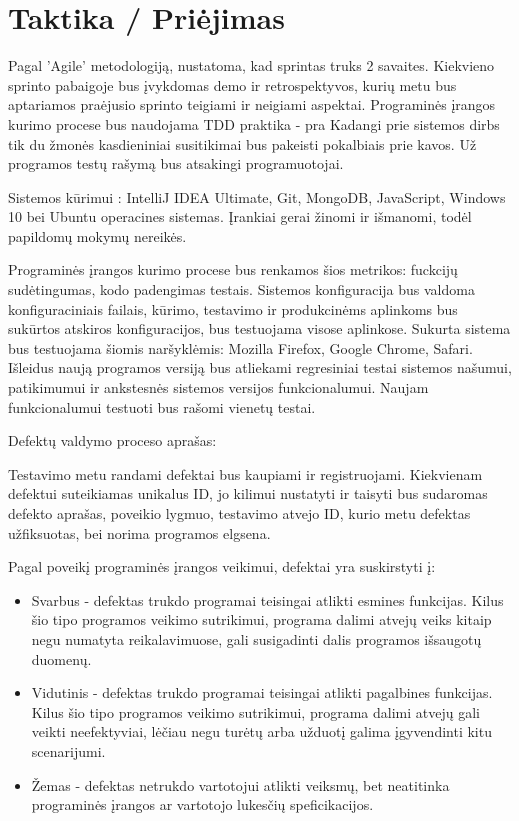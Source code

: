\section{Taktika / Priėjimas}

Pagal 'Agile' metodologiją, nustatoma, kad sprintas truks 2 savaites.
Kiekvieno sprinto pabaigoje bus įvykdomas demo ir retrospektyvos,
 kurių metu bus aptariamos praėjusio sprinto teigiami ir neigiami aspektai.
Programinės įrangos kurimo procese bus naudojama TDD praktika - pra
Kadangi prie sistemos dirbs tik du žmonės kasdieniniai susitikimai bus pakeisti pokalbiais prie kavos.
Už programos testų rašymą bus atsakingi programuotojai.


Sistemos kūrimui : IntelliJ IDEA Ultimate, Git, MongoDB, JavaScript, Windows 10 bei Ubuntu operacines sistemas.
Įrankiai gerai žinomi ir išmanomi, todėl papildomų mokymų nereikės. 

Programinės įrangos kurimo procese bus renkamos šios metrikos: fuckcijų sudėtingumas, kodo padengimas testais.
Sistemos konfiguracija bus valdoma konfiguraciniais failais,
 kūrimo, testavimo ir produkcinėms aplinkoms bus sukūrtos atskiros konfiguracijos, bus testuojama visose aplinkose.
Sukurta sistema bus testuojama šiomis naršyklėmis: Mozilla Firefox, Google Chrome, Safari.
Išleidus naują programos versiją bus atliekami regresiniai testai sistemos našumui,
 patikimumui ir ankstesnės sistemos versijos funkcionalumui.
Naujam funkcionalumui testuoti bus rašomi vienetų testai. 

Defektų valdymo proceso aprašas:

Testavimo metu randami defektai bus kaupiami ir registruojami. 
Kiekvienam defektui suteikiamas unikalus ID, jo kilimui nustatyti ir taisyti bus sudaromas defekto aprašas, poveikio lygmuo, 
 testavimo atvejo ID, kurio metu defektas užfiksuotas, bei norima programos elgsena.

Pagal poveikį programinės įrangos veikimui, defektai yra suskirstyti į:

\begin{itemize}
	\item Svarbus - defektas trukdo programai teisingai atlikti esmines funkcijas. Kilus šio tipo programos
	veikimo sutrikimui, programa dalimi atvejų veiks kitaip negu numatyta reikalavimuose,
	gali susigadinti dalis programos išsaugotų duomenų.
	\item Vidutinis - defektas trukdo programai teisingai atlikti pagalbines funkcijas. Kilus šio tipo
	programos veikimo sutrikimui, programa dalimi atvejų gali veikti neefektyviai, lėčiau negu turėtų arba užduotį galima įgyvendinti kitu scenarijumi.
  \item Žemas - defektas netrukdo vartotojui atlikti veiksmų, bet neatitinka programinės įrangos ar vartotojo lukesčių speficikacijos.
\end{itemize}

